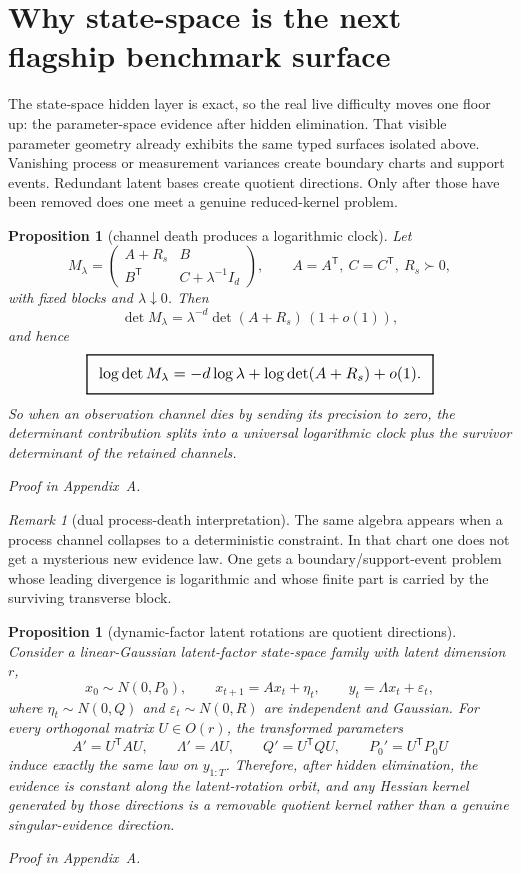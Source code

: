 \documentclass[11pt,a4paper]{article}
\numberwithin{equation}{section}
\newcommand{\geomboxed}[1]{%
  \setlength{\fboxsep}{8pt}%
  \setlength{\fboxrule}{0.9pt}%
  \fbox{\scalebox{1.12}{$\displaystyle #1$}}%
}
\theoremstyle{thmcompact}
\newtheorem{proposition}[theorem]{Proposition}
\theoremstyle{remark}
\newtheorem*{remarkplain}{Remark}
\newenvironment{remark}[1][]%
{\begin{remarkbox}\begin{remarkplain}[#1]\normalfont}
{\end{remarkplain}\end{remarkbox}}
\newcommand{\proofappendix}{\par{\hfill\scriptsize\emph{Proof in Appendix~A.}}\par}
\begin{document}
\section{Why state-space is the next flagship benchmark surface}

The state-space hidden layer is exact, so the real live difficulty moves one floor up: the parameter-space evidence after hidden elimination. That visible parameter geometry already exhibits the same typed surfaces isolated above. Vanishing process or measurement variances create boundary charts and support events. Redundant latent bases create quotient directions. Only after those have been removed does one meet a genuine reduced-kernel problem.

\begin{proposition}[channel death produces a logarithmic clock]\label{prop:channel-death}
Let
\[
M_\lambda
=
\begin{pmatrix}
A+R_s & B\\
B^{\mathsf T} & C+\lambda^{-1}I_d
\end{pmatrix},
\qquad
A=A^{\mathsf T},\ C=C^{\mathsf T},\ R_s\succ0,
\]
with fixed blocks and $\lambda\downarrow0$. Then
\[
\det M_\lambda
=
\lambda^{-d}\det(A+R_s)\,(1+o(1)),
\]
and hence
\[
\geomboxed{\log\det M_\lambda = -d\log\lambda + \log\det(A+R_s) + o(1).}
\]
So when an observation channel dies by sending its precision to zero, the determinant contribution splits into a universal logarithmic clock plus the survivor determinant of the retained channels.
\proofappendix
\end{proposition}

\begin{remark}[dual process-death interpretation]
The same algebra appears when a process channel collapses to a deterministic constraint. In that chart one does not get a mysterious new evidence law. One gets a boundary/support-event problem whose leading divergence is logarithmic and whose finite part is carried by the surviving transverse block.
\end{remark}

\begin{proposition}[dynamic-factor latent rotations are quotient directions]\label{prop:dynamic-factor-quotient}
Consider a linear-Gaussian latent-factor state-space family with latent dimension $r$,
\[
x_0\sim N(0,P_0),
\qquad
x_{t+1}=Ax_t+\eta_t,
\qquad
y_t=\Lambda x_t+\varepsilon_t,
\]
where $\eta_t\sim N(0,Q)$ and $\varepsilon_t\sim N(0,R)$ are independent and Gaussian. For every orthogonal matrix $U\in O(r)$, the transformed parameters
\[
A' = U^{\mathsf T}AU,
\qquad
\Lambda' = \Lambda U,
\qquad
Q' = U^{\mathsf T}QU,
\qquad
P_0' = U^{\mathsf T}P_0U
\]
induce exactly the same law on $y_{1:T}$. Therefore, after hidden elimination, the evidence is constant along the latent-rotation orbit, and any Hessian kernel generated by those directions is a removable quotient kernel rather than a genuine singular-evidence direction.
\proofappendix
\end{proposition}
\end{document}
